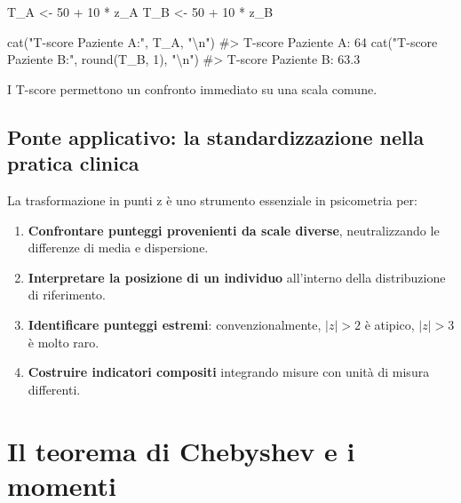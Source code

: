 \documentclass[
  italian,
  letterpaper,
  a4paper,
  11pt,
  open=any]{scrbook}
\newenvironment{Shaded}{\begin{snugshade}}{\end{snugshade}}
\newcommand{\CommentTok}[1]{\textcolor[rgb]{0.37,0.37,0.37}{#1}}
\newcommand{\DecValTok}[1]{\textcolor[rgb]{0.68,0.00,0.00}{#1}}
\newcommand{\FunctionTok}[1]{\textcolor[rgb]{0.28,0.35,0.67}{#1}}
\newcommand{\NormalTok}[1]{\textcolor[rgb]{0.00,0.23,0.31}{#1}}
\newcommand{\OtherTok}[1]{\textcolor[rgb]{0.00,0.23,0.31}{#1}}
\newcommand{\SpecialCharTok}[1]{\textcolor[rgb]{0.37,0.37,0.37}{#1}}
\newcommand{\StringTok}[1]{\textcolor[rgb]{0.13,0.47,0.30}{#1}}
\providecommand{\tightlist}{%
  \setlength{\itemsep}{0pt}\setlength{\parskip}{0pt}}
\theoremstyle{plain}
\theoremstyle{definition}
\theoremstyle{definition}
\theoremstyle{remark}
\begin{document}
\begin{tcolorbox}
\begin{Shaded}
\begin{Highlighting}[]
\NormalTok{T\_A }\OtherTok{\textless{}{-}} \DecValTok{50} \SpecialCharTok{+} \DecValTok{10} \SpecialCharTok{*}\NormalTok{ z\_A}
\NormalTok{T\_B }\OtherTok{\textless{}{-}} \DecValTok{50} \SpecialCharTok{+} \DecValTok{10} \SpecialCharTok{*}\NormalTok{ z\_B}

\FunctionTok{cat}\NormalTok{(}\StringTok{"T{-}score Paziente A:"}\NormalTok{, T\_A, }\StringTok{"}\SpecialCharTok{\textbackslash{}n}\StringTok{"}\NormalTok{)}
\CommentTok{\#\textgreater{} T{-}score Paziente A: 64}
\FunctionTok{cat}\NormalTok{(}\StringTok{"T{-}score Paziente B:"}\NormalTok{, }\FunctionTok{round}\NormalTok{(T\_B, }\DecValTok{1}\NormalTok{), }\StringTok{"}\SpecialCharTok{\textbackslash{}n}\StringTok{"}\NormalTok{)}
\CommentTok{\#\textgreater{} T{-}score Paziente B: 63.3}
\end{Highlighting}
\end{Shaded}

I T-score permettono un confronto immediato su una scala comune.

\end{tcolorbox}

\subsection{Ponte applicativo: la standardizzazione nella pratica
clinica}\label{ponte-applicativo-la-standardizzazione-nella-pratica-clinica}

La trasformazione in punti z è uno strumento essenziale in psicometria
per:

\begin{enumerate}
\def\labelenumi{\arabic{enumi}.}
\tightlist
\item
  \textbf{Confrontare punteggi provenienti da scale diverse},
  neutralizzando le differenze di media e dispersione.
\item
  \textbf{Interpretare la posizione di un individuo} all'interno della
  distribuzione di riferimento.
\item
  \textbf{Identificare punteggi estremi}: convenzionalmente, \(|z| > 2\)
  è atipico, \(|z| > 3\) è molto raro.
\item
  \textbf{Costruire indicatori compositi} integrando misure con unità di
  misura differenti.
\end{enumerate}

\section{Il teorema di Chebyshev e i
momenti}\label{sec-chebyshev-moments}
\end{document}
